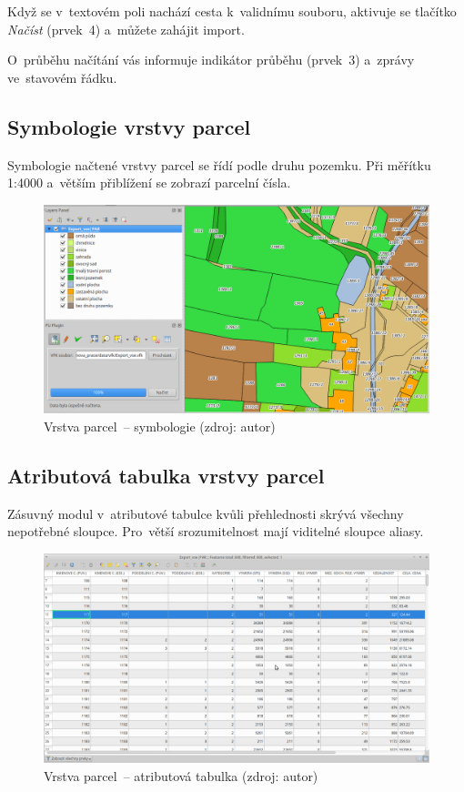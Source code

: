 Když se v~textovém poli nachází cesta k~validnímu  souboru,
aktivuje se tlačítko \textit{Načíst} (prvek~4) a~můžete zahájit
import.

O~průběhu načítání vás informuje indikátor průběhu (prvek~3) a~zprávy
ve~stavovém řádku.

\subsection{Symbologie vrstvy parcel}
\label{manual_nacteni_symbologie}

Symbologie načtené vrstvy parcel se řídí podle druhu pozemku. Při
měřítku 1:4000 a~větším přiblížení se zobrazí parcelní čísla.

	\begin{figure}[H] \centering
		\includegraphics[width=.9\textwidth]{./pictures/symbologie_par.png}
		\caption[Vrstva parcel~– symbologie]{Vrstva parcel~–
symbologie (zdroj: autor)}
		\label{fig:manual_symbologie_par}
 	\end{figure}

\subsection{Atributová tabulka vrstvy parcel}
\label{manual_nacteni_tabulka}

Zásuvný modul v~atributové tabulce kvůli přehlednosti skrývá všechny
nepotřebné sloupce. Pro~větší srozumitelnost mají viditelné sloupce
aliasy.

	\begin{figure}[H] \centering
		\includegraphics[width=.95\textwidth]{./pictures/nacteni-tabulka.png}
		\caption[Vrstva parcel~– atributová tabulka]{Vrstva
parcel~– atributová tabulka (zdroj: autor)}
		\label{fig:manual_tabulka_par}
 	\end{figure}


